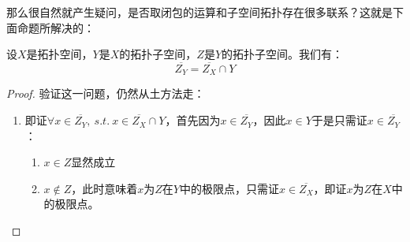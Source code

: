 \documentclass[lang=cn,10pt,device=pad]{elegantbook}
\newcommand{\cusong}{\CJKfamily{cusong}}%
\newcommand{\lei}[1]{~\textcolor{myblu}{\cusong{#1}}~}
\newcommand{\st}{~s.t.~}
\begin{document}
那么很自然就产生疑问，是否取闭包的运算和子空间拓扑存在很多联系？这就是下面命题所解决的：
\begin{proposition}
\label{c1-m4}
	设$X$是拓扑空间，$Y$是$X$的拓扑子空间，$Z$是$Y$的拓扑子空间。我们有：
	\begin{equation*}
		\overline{Z_{Y}} = \overline{Z_{X}} \cap Y
	\end{equation*}
\end{proposition}
\begin{proof}
	验证这一问题，仍然从土方法走：
	\begin{enumerate}
		\item[\lei{[$\subset$]}] 即证$\forall x\in \overline{Z_{Y}}, \st x\in \overline{Z_{X}} \cap Y$，首先因为$x\in \overline{Z_{Y}}$，因此$x\in Y$于是只需证$x\in \overline{Z_{Y}}$：
		\begin{enumerate}
			\item $x \in Z $显然成立
			\item $x \notin Z $，此时意味着$x$为$Z$在$Y$中的极限点，只需证$x\in \overline{Z_{X}}$，即证$x$为$Z$在$X$中的极限点。
			

\end{enumerate}
\end{enumerate}
\end{proof}
\end{document}
